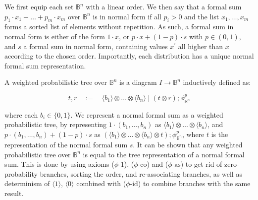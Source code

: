  
 
We first equip each set $\mathbb{B}^{n}$ with a linear order. We then say that a formal sum $p_{1}\cdot x_{1}+\dots+p_{m}\cdot x_{m}$ over $\mathbb{B}^{n}$ is in normal form if all $p_{i}>0$ and the list $x_{1},\dots,x_{m}$ forms a sorted list of elements without repetition. As such, a formal sum in normal form is either of the form $1\cdot x$, or $p\cdot x+(1-p)\cdot s$ with $p\in(0,1)$, and $s$ a formal sum in normal form, containing values $x^{\prime}$ all higher than $x$ according to the chosen order. Importantly, each distribution has a unique normal formal sum representation.\par
 
 
 
A weighted probabilistic tree over $\mathbb{B}^{n}$ is a diagram $I\to\mathbb{B}^{n}$ inductively defined as:\par
  
\par  \quad  \[t,r\quad:=\quad\langle b_{1}\rangle\otimes\dots\otimes\langle b_{n}\rangle\mid(t\otimes r);\phi^{p}_{\mathbb{B}^{n}}\]\quad  \quad  
  
where each $b_{i}\in\{0,1\}$. We represent a normal formal sum as a weighted probabilistic tree, by representing $1\cdot(b_{1},\dots,b_{n})$ as $\langle b_{1}\rangle\otimes\dots\otimes\langle b_{n}\rangle$, and $p\cdot(b_{1},\dots,b_{n})+(1-p)\cdot s$ as $(\langle b_{1}\rangle\otimes\dots\otimes\langle b_{n}\rangle\otimes t);\phi^{p}_{\mathbb{B}^{n}}$, where $t$ is the representation of the normal formal sum $s$. It can be shown that any weighted probabilistic tree over $\mathbb{B}^{n}$ is equal to the tree representation of a normal formal sum. This is done by using axioms ($\phi\text{-1}$), ($\phi\text{-co}$) and ($\phi\text{-as}$) to get rid of zero-probability branches, sorting the order, and re-associating branches, as well as determinism of $\langle 1\rangle$, $\langle 0\rangle$ combined with ($\phi\text{-id}$) to combine branches with the same result.\par
 
 
 
